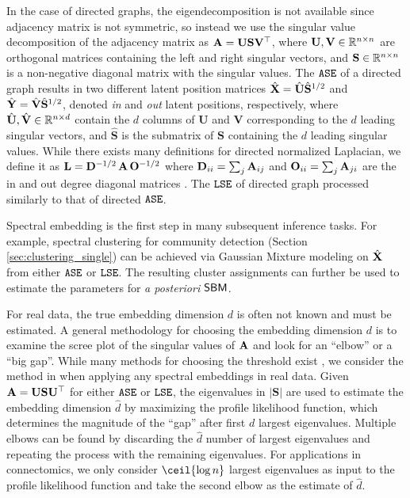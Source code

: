 In the case of directed graphs, the eigendecomposition is not available since adjacency matrix is not symmetric, so instead we use the singular value decomposition of the adjacency matrix as $\operatorname{\mathbf{A}}=\mathbf{U}\mathbf{S}\mathbf{V}^\top$, where $\mathbf{U},\mathbf{V}\in\mathbb{R}^{n\times n}$ are orthogonal matrices containing the left and right singular vectors, and $\mathbf{S}\in\mathbb{R}^{n\times n}$ is a non-negative diagonal matrix with the singular values. 
The $\operatorname{\mathtt{ASE}}$ of a directed graph results in two different latent position matrices $\hat{\operatorname{\mathbf{X}}}= \hat{\mathbf{U}}\hat{\mathbf{S}}^{1/2}$ and $\hat{\operatorname{\mathbf{Y}}}= \hat{\mathbf{V}}\hat{\mathbf{S}}^{1/2}$, denoted \textit{in} and \textit{out} latent positions, respectively, where $\hat{\mathbf{U}},\hat{\mathbf{V}}\in\mathbb{R}^{n\times d}$ contain the $d$ columns of $\mathbf{U}$ and $\mathbf{V}$ corresponding to the $d$ leading singular vectors, and $\hat{\mathbf{S}}$ is the submatrix of $\mathbf{S}$ containing the $d$ leading singular values. 
While there exists many definitions for directed normalized Laplacian, we define it as $\mathbf{L} = \mathbf{D}^{-1/2}\operatorname{\mathbf{A}}\mathbf{O}^{-1/2}$ where $\mathbf{D}_{ii} =\sum_j\operatorname{\mathbf{A}}_{ij}$ and  $\mathbf{O}_{ii} =\sum_j\operatorname{\mathbf{A}}_{ji}$ are the in and out degree diagonal matrices \cite{rohe2016co}. The $\operatorname{\mathtt{LSE}}$ of directed graph processed similarly to that of directed $\operatorname{\mathtt{ASE}}$. 

Spectral embedding is the first step in many subsequent inference tasks. For example, spectral clustering for community detection (Section \ref{sec:clustering_single}) can be achieved via Gaussian Mixture modeling on $\hat {\operatorname{\mathbf{X}}}$ from either $\operatorname{\mathtt{ASE}}$ or $\operatorname{\mathtt{LSE}}$. The resulting cluster assignments can further be used to estimate the parameters for \textit{a posteriori} $\operatorname{\mathsf{SBM}}$. 

For real data, the true embedding dimension $d$ is often not known and must be estimated. A general methodology for choosing the embedding dimension $d$ is to examine the scree plot of the singular values of $\operatorname{\mathbf{A}}$ and look for an ``elbow'' or a ``big gap''. While many methods for choosing the threshold exist \cite{jackson2005user,chatterjee2015matrix}, we consider the method in \cite{zhu2006automatic} when applying any spectral embeddings in real data. Given $\operatorname{\mathbf{A}}= \mathbf{U}\mathbf{S}\mathbf{U}^\top$ for either $\operatorname{\mathtt{ASE}}$ or $\operatorname{\mathtt{LSE}}$, the eigenvalues in $|\mathbf{S}|$ are used to estimate the embedding dimension $\hat d$ by maximizing the profile likelihood function, which determines the magnitude of the ``gap'' after first $d$ largest eigenvalues. Multiple elbows can be found by discarding the $\hat d$ number of largest eigenvalues and repeating the process with the remaining eigenvalues. For applications in connectomics, we only consider $\ceil{\log{n}}$ largest eigenvalues as input to the profile likelihood function and take the second elbow as the estimate of $\hat d$.

